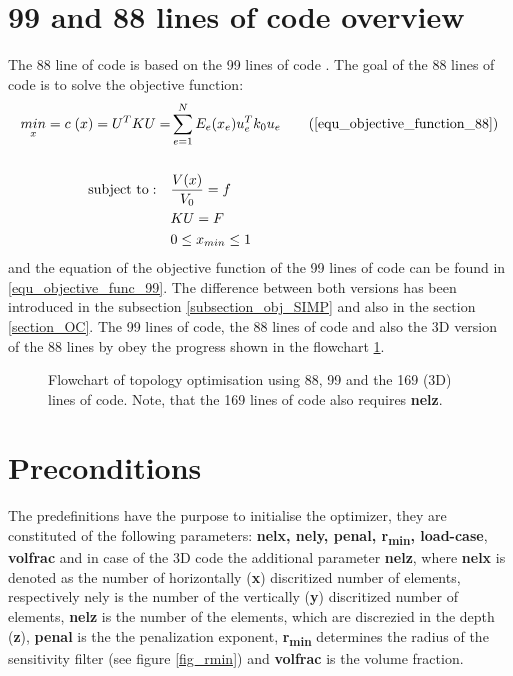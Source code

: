 \section{99 and 88 lines of code overview}
The 88 line of code \cite{Andreassen.2011} is based on the 99 lines of code \cite{Sigmund.2001}. 
The goal of the 88 lines of code is to solve the objective function:
\begin{align}
\underset{x}{min} = c \;(x) =  U^TKU = & \sum_{e = 1}^N E_e(x_e)u_e^Tk_0u_e 
\tag{\ref{equ_objective_function_88}}
\\ \nonumber \\ \nonumber
 \text{subject to}: \quad &\frac{V(x)}{V_0} = f \\ \nonumber
& KU = F\\ \nonumber
& 0\leq x_{min} \leq 1
\end{align}
and the equation of the objective function of the 99 lines of code can be found in \eqref{equ_objective_func_99}. The difference between both versions has been introduced in the subsection \ref{subsection_obj_SIMP} and also in the section
\ref{section_OC}.
The 99 lines of code, the 88 lines of code and also the 3D version of the 88 lines by \cite{Liu.2014} obey the progress shown in the flowchart \ref{fig_flowchart_88}.

 \begin{figure} [!h]
 \centering
 \def\svgwidth{\textwidth}
 
 \caption{Flowchart of topology optimisation using 88, 99 and the 169 (3D) lines of code. Note, that the 169 lines of code also requires \textbf{nelz}.}  
 \label{fig_flowchart_88}          %
\end{figure} 
 
% 
\newpage
\section{Preconditions}
The predefinitions have the purpose to initialise the optimizer, they are constituted of the following parameters: \textbf{nelx, nely, penal, r\textsubscript{min}, load-case}, \textbf{volfrac} and in case of the 3D code the additional parameter \textbf{nelz}, where \textbf{nelx} is denoted as the number of horizontally (\textbf{x}) discritized number of elements, respectively nely is the number of the vertically (\textbf{y}) discritized number of elements, \textbf{nelz} is the number of the elements, which are discrezied in the depth (\textbf{z}), \textbf{penal}
is the the penalization exponent, \textbf{r\textsubscript{min}} determines the radius of the sensitivity filter (see figure \ref{fig_rmin}) and \textbf{volfrac} is the volume fraction.

